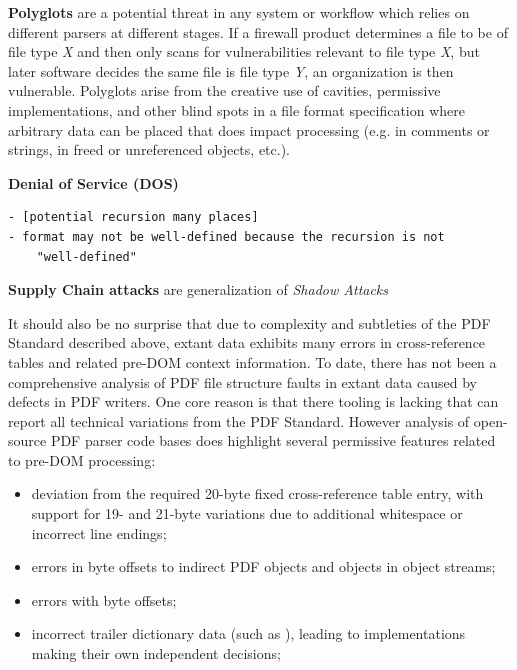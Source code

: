 {\bf{Polyglots}} are a potential threat in any system or workflow which relies on different parsers
at different stages. If a firewall product determines a file to be of file type \emph{X} and then only 
scans for vulnerabilities relevant to file type \emph{X}, but later software decides the same file 
is file type \emph{Y}, an organization is then vulnerable. Polyglots arise from the creative use of
cavities, permissive implementations, 
and other blind spots in a file format specification where arbitrary data can be placed 
that does impact processing (e.g. in comments or strings, in freed or unreferenced objects, etc.).

{\bf{Denial of Service (DOS)}} 
%
\begin{lstlisting}[style=meta]
- [potential recursion many places]
- format may not be well-defined because the recursion is not
    "well-defined"
\end{lstlisting}

{\bf{Supply Chain attacks}} are generalization of \emph{Shadow Attacks}

It should also be no surprise that due to complexity and subtleties of the PDF Standard described above,
extant data exhibits many errors in cross-reference tables and related pre-DOM context information.
To date, there has not been a comprehensive analysis of PDF file structure faults in extant data
caused by defects in PDF writers. One core reason is that there tooling is lacking that can report
all technical variations from the PDF Standard. However analysis of open-source PDF parser code bases
does highlight several permissive features related to pre-DOM processing:

\begin{itemize}
    \item deviation from the required 20-byte fixed cross-reference table entry, with support for
    19- and 21-byte variations due to additional whitespace or incorrect line endings;
    \item errors in byte offsets to indirect PDF objects and objects in object streams;
    \item errors with  byte offsets;
    \item incorrect trailer dictionary data (such as ), leading to implementations 
    making their own independent decisions;  
\end{itemize}

